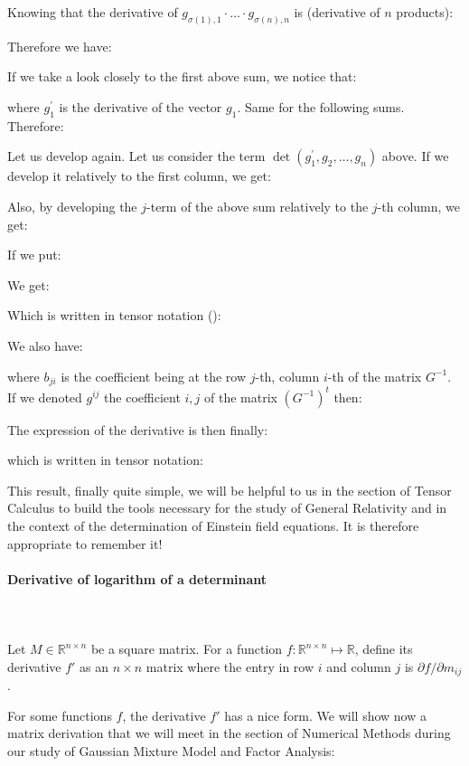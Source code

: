 	Knowing that the derivative of $g_{\sigma(1),1}\cdot \ldots \cdot g_{\sigma(n),n}$ is (derivative of $n$ products):
	
	Therefore we have:
	
	If we take a look closely to the first above sum, we notice that:
	
	where $g_1^{\prime}$ is the derivative of the vector $g_1$. Same for the following sums. Therefore:
	
	Let us develop again. Let us consider the term $\det(g_1^{\prime},g_2,\ldots,g_n)$ above. If we develop it relatively to the first column, we get:
	
	 Also, by developing the $j$-term of the above sum relatively to the $j$-th column, we get:
	
	If we put:
	
	We get:
	
	Which is written in tensor notation ():
	
	We also have:
	
	where $b_{ji}$ is the coefficient being at the row $j$-th, column $i$-th of the matrix $G^{-1}$. If we denoted $g^{ij}$ the coefficient $i,j$ of the matrix $(G^{-1})^t$ then:
	
	The expression of the derivative is then finally:
	
	which is written in tensor notation:
	
	This result, finally quite simple, we will be helpful to us in the section of Tensor Calculus to build the tools necessary for the study of General Relativity and in the context of the determination of Einstein field equations. It is therefore appropriate to remember it!
	
	\paragraph{Derivative of logarithm of a determinant}\label{derivative of logarithm of a determinant}\mbox{}\\\\
	Let $M \in \mathbb{R}^{n \times n}$ be a square matrix. For a function $f: \mathbb{R}^{n \times n} \mapsto \mathbb{R}$, define its derivative $f'$ as an $n \times n$ matrix where the entry in row $i$ and column $j$ is $\partial f/\partial m_{ij}$.

	For some functions $f$, the derivative $f'$ has a nice form. We will show now a matrix derivation that we will meet in the section of Numerical Methods during our study of Gaussian Mixture Model and Factor Analysis:
	
